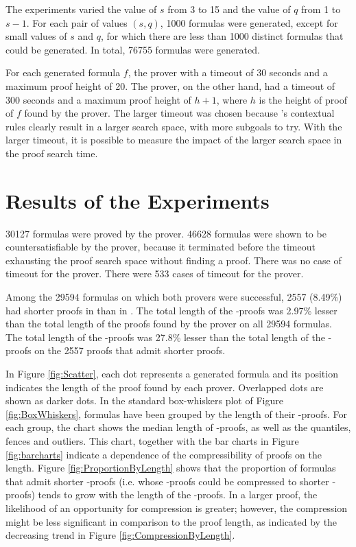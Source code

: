 \documentclass{llncs}
\begin{document}
The experiments varied the value of $s$ from 3 to 15 and the value of $q$ from 1 to $s-1$. For each pair of values $(s,q)$, 1000 formulas were generated, except for small values of $s$ and $q$, for which there are less than 1000 distinct formulas that could be generated. In total, 76755 formulas were generated.

For each generated formula $f$, the {\ND} prover with a timeout of 30 seconds and a maximum proof height of 20. The {\NDd} prover, on the other hand, had a timeout of 300 seconds and a maximum proof height of $h + 1$, where $h$ is the height of proof of $f$ found by the {\ND} prover. The larger timeout was chosen because {\NDd}'s contextual rules clearly result in a larger search space, with more subgoals to try. With the larger timeout, it is possible to measure the impact of the larger search space in the proof search time.


\section{Results of the Experiments}
\label{sec:Results}

30127 formulas were proved by the {\ND} prover. 46628 formulas were shown to be countersatisfiable by the {\ND} prover, because it terminated before the timeout exhausting the proof search space without finding a proof. There was no case of timeout for the {\ND} prover. There were 533 cases of timeout for the {\NDd} prover.

Among the 29594 formulas on which both provers were successful, 2557 (8.49\%) had shorter proofs in {\NDd} than in {\ND}. The total length of the {\NDd}-proofs was 2.97\% lesser than the total length of the proofs found by the {\ND} prover on all 29594 formulas. The total length of the {\NDd}-proofs was 27.8\% lesser than the total length of the {\ND}-proofs on the 2557 proofs that admit shorter {\NDd} proofs.

In Figure \ref{fig:Scatter}, each dot represents a generated formula and its position indicates the length of the proof found by each prover. Overlapped dots are shown as darker dots. In the standard box-whiskers plot of Figure \ref{fig:BoxWhiskers}, formulas have been grouped by the length of their {\ND}-proofs. For each group, the chart shows the median length of {\NDd}-proofs, as well as the quantiles, fences and outliers. This chart, together with the bar charts in Figure \ref{fig:barcharts} indicate a dependence of the compressibility of proofs on the length. Figure \ref{fig:ProportionByLength} shows that the proportion of formulas that admit shorter {\NDd}-proofs (i.e. whose {\ND}-proofs could be compressed to shorter {\NDd}-proofs) tends to grow with the length of the {\ND}-proofs. In a larger proof, the likelihood of an opportunity for compression is greater; however, the compression might be less significant in comparison to the proof length, as indicated by the decreasing trend in Figure \ref{fig:CompressionByLength}.
\end{document}
